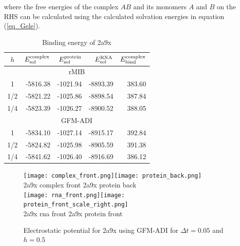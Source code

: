 where the free energies of the complex $AB$ and its monomers $A$ and $B$ on the RHS can be calculated using the calculated solvation energies in equation (\ref{eq_Gele}). 
\begin{table}[!ht]
\centering
\begin{tabular}{crrrr}
\hline
$h$ & $E_{\rm sol}^{\rm complex}$ & $E_{\rm sol}^{\rm protein}$ & $E_{\rm sol}^{\rm RNA}$ & $E_{\rm bind}^{\rm complex}$ \\ \hline
\multicolumn{5}{c}{rMIB}  \\ \hline
1   & -5816.38 & -1021.94 & -8893.39 & 383.60 \\
1/2 & -5821.22 & -1025.86 & -8898.54 & 387.84 \\
1/4 & -5823.39 & -1026.27 & -8900.52 & 388.05 \\ \hline
\multicolumn{5}{c}{GFM-ADI}  				  \\ \hline
1   & -5834.10 & -1027.14 & -8915.17 & 392.84 \\
1/2 & -5824.82 & -1025.98 & -8905.59 & 391.38 \\
1/4 & -5841.62 & -1026.40 & -8916.69 & 386.12 \\ \hline
\end{tabular}
\caption{Binding energy of 2a9x}
\label{tab_2a9x}
\end{table}



\begin{figure}[!ht]
	\begin{center}
		\texttt{[image: complex\_front.png]}\texttt{[image: protein\_back.png]}\\
		\hskip 0.5in 2a9x complex front\hskip 2.5in 2a9x  protein back\\
		\texttt{[image: rna\_front.png]}\texttt{[image: protein\_front\_scale\_right.png]}\\
		\hskip 0.7in 2a9x rna front\hskip 2.8in 2a9x  protein front\\
		\caption{Electrostatic potential for 2a9x using GFM-ADI for $\Delta t = 0.05$ and $h = 0.5$}
	\end{center}
\end{figure}

